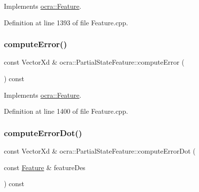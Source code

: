 Implements \hyperlink{classocra_1_1Feature_aaa74d6869f7e574fcc39d443581ddf77}{ocra\+::\+Feature}.



Definition at line 1393 of file Feature.\+cpp.

\hypertarget{classocra_1_1PartialStateFeature_a7d412f45a1ae3ce72a82cee84cdddc7e}{}\label{classocra_1_1PartialStateFeature_a7d412f45a1ae3ce72a82cee84cdddc7e} 
\subsubsection{\texorpdfstring{compute\+Error()}{computeError()}\hspace{0.1cm}{\footnotesize\ttfamily [2/2]}}
{\footnotesize\ttfamily const Vector\+Xd \& ocra\+::\+Partial\+State\+Feature\+::compute\+Error (\begin{DoxyParamCaption}{ }\end{DoxyParamCaption}) const\hspace{0.3cm}{\ttfamily [virtual]}}



Implements \hyperlink{classocra_1_1Feature_a88f87b496aedc7bf9f13b19bb8f9c7fa}{ocra\+::\+Feature}.



Definition at line 1400 of file Feature.\+cpp.

\hypertarget{classocra_1_1PartialStateFeature_a5abaab0eb99ac60f0150c4137960ee14}{}\label{classocra_1_1PartialStateFeature_a5abaab0eb99ac60f0150c4137960ee14} 
\subsubsection{\texorpdfstring{compute\+Error\+Dot()}{computeErrorDot()}\hspace{0.1cm}{\footnotesize\ttfamily [1/2]}}
{\footnotesize\ttfamily const Vector\+Xd \& ocra\+::\+Partial\+State\+Feature\+::compute\+Error\+Dot (\begin{DoxyParamCaption}\item[{const \hyperlink{classocra_1_1Feature}{Feature} \&}]{feature\+Des }\end{DoxyParamCaption}) const\hspace{0.3cm}{\ttfamily [virtual]}}



